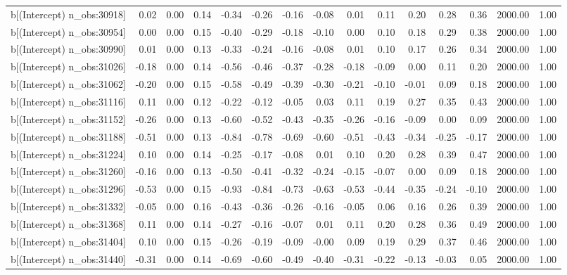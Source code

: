\begin{table}[ht]
\begin{tabular}{rrrrrrrrrrrrrrr}
  b[(Intercept) n\_obs:30918] & 0.02 & 0.00 & 0.14 & -0.34 & -0.26 & -0.16 & -0.08 & 0.01 & 0.11 & 0.20 & 0.28 & 0.36 & 2000.00 & 1.00 \\ 
  b[(Intercept) n\_obs:30954] & 0.00 & 0.00 & 0.15 & -0.40 & -0.29 & -0.18 & -0.10 & 0.00 & 0.10 & 0.18 & 0.29 & 0.38 & 2000.00 & 1.00 \\ 
  b[(Intercept) n\_obs:30990] & 0.01 & 0.00 & 0.13 & -0.33 & -0.24 & -0.16 & -0.08 & 0.01 & 0.10 & 0.17 & 0.26 & 0.34 & 2000.00 & 1.00 \\ 
  b[(Intercept) n\_obs:31026] & -0.18 & 0.00 & 0.14 & -0.56 & -0.46 & -0.37 & -0.28 & -0.18 & -0.09 & 0.00 & 0.11 & 0.20 & 2000.00 & 1.00 \\ 
  b[(Intercept) n\_obs:31062] & -0.20 & 0.00 & 0.15 & -0.58 & -0.49 & -0.39 & -0.30 & -0.21 & -0.10 & -0.01 & 0.09 & 0.18 & 2000.00 & 1.00 \\ 
  b[(Intercept) n\_obs:31116] & 0.11 & 0.00 & 0.12 & -0.22 & -0.12 & -0.05 & 0.03 & 0.11 & 0.19 & 0.27 & 0.35 & 0.43 & 2000.00 & 1.00 \\ 
  b[(Intercept) n\_obs:31152] & -0.26 & 0.00 & 0.13 & -0.60 & -0.52 & -0.43 & -0.35 & -0.26 & -0.16 & -0.09 & 0.00 & 0.09 & 2000.00 & 1.00 \\ 
  b[(Intercept) n\_obs:31188] & -0.51 & 0.00 & 0.13 & -0.84 & -0.78 & -0.69 & -0.60 & -0.51 & -0.43 & -0.34 & -0.25 & -0.17 & 2000.00 & 1.00 \\ 
  b[(Intercept) n\_obs:31224] & 0.10 & 0.00 & 0.14 & -0.25 & -0.17 & -0.08 & 0.01 & 0.10 & 0.20 & 0.28 & 0.39 & 0.47 & 2000.00 & 1.00 \\ 
  b[(Intercept) n\_obs:31260] & -0.16 & 0.00 & 0.13 & -0.50 & -0.41 & -0.32 & -0.24 & -0.15 & -0.07 & 0.00 & 0.09 & 0.18 & 2000.00 & 1.00 \\ 
  b[(Intercept) n\_obs:31296] & -0.53 & 0.00 & 0.15 & -0.93 & -0.84 & -0.73 & -0.63 & -0.53 & -0.44 & -0.35 & -0.24 & -0.10 & 2000.00 & 1.00 \\ 
  b[(Intercept) n\_obs:31332] & -0.05 & 0.00 & 0.16 & -0.43 & -0.36 & -0.26 & -0.16 & -0.05 & 0.06 & 0.16 & 0.26 & 0.39 & 2000.00 & 1.00 \\ 
  b[(Intercept) n\_obs:31368] & 0.11 & 0.00 & 0.14 & -0.27 & -0.16 & -0.07 & 0.01 & 0.11 & 0.20 & 0.28 & 0.36 & 0.49 & 2000.00 & 1.00 \\ 
  b[(Intercept) n\_obs:31404] & 0.10 & 0.00 & 0.15 & -0.26 & -0.19 & -0.09 & -0.00 & 0.09 & 0.19 & 0.29 & 0.37 & 0.46 & 2000.00 & 1.00 \\ 
  b[(Intercept) n\_obs:31440] & -0.31 & 0.00 & 0.14 & -0.69 & -0.60 & -0.49 & -0.40 & -0.31 & -0.22 & -0.13 & -0.03 & 0.05 & 2000.00 & 1.00 \\ 

\end{tabular}
\end{table}
